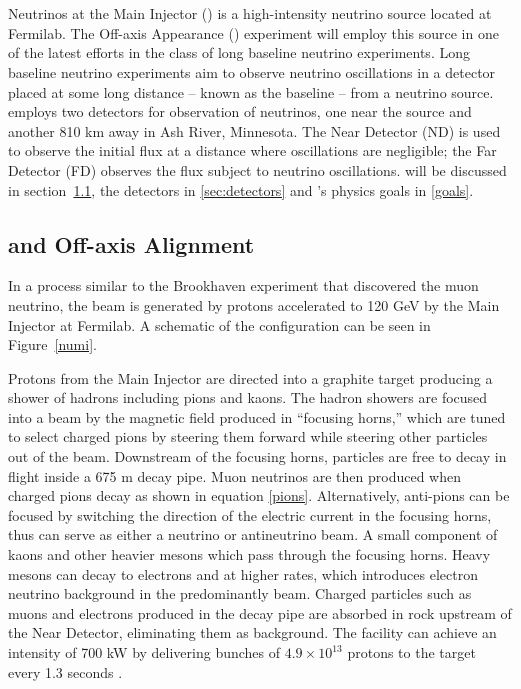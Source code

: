 \chapter{\nova}
\label{nova_chapter}
Neutrinos at the Main Injector (\numi) is a high-intensity neutrino source located at Fermilab.  The \numi Off-axis \nue Appearance (\nova) experiment will employ this source in one of the latest efforts in the class of long baseline neutrino experiments.  Long baseline neutrino experiments aim to observe neutrino oscillations in a detector placed at some long distance -- known as the baseline -- from a neutrino source.  \nova employs two detectors for observation of neutrinos, one near the source and another 810 km away in Ash River, Minnesota.  The Near Detector (ND) is used to observe the initial  \numi flux at a distance where oscillations are negligible; the Far Detector (FD) observes the \numi flux subject to neutrino oscillations.  \numi will be discussed in section~\ref{sec:numi}, the detectors in \ref{sec:detectors} and \nova's physics goals in \ref{goals}. 

\section{\numi and  Off-axis Alignment }\label{sec:numi}

In a process similar to the Brookhaven experiment that discovered the muon neutrino, the \numi beam is generated by protons accelerated to 120 GeV by the Main Injector at Fermilab.  A schematic of the \numi configuration can be seen in Figure~\ref{numi}.  

Protons from the Main Injector are directed into a graphite target producing a shower of hadrons including pions and kaons.  The hadron showers are focused into a beam by the magnetic field produced in ``focusing horns,'' which are tuned to select charged pions by steering them forward while steering other particles out of the beam.  Downstream of the focusing horns, particles are free to decay in flight inside a 675 m decay pipe.  Muon neutrinos are then produced when charged pions decay as shown in equation \eqref{pions}.  Alternatively, anti-pions can be focused by switching the direction of the electric current in the focusing horns, thus \numi can serve as either a neutrino or antineutrino beam.  A small component of kaons and other heavier mesons which pass through the focusing horns.  Heavy mesons can decay to electrons and \nue at higher rates, which introduces electron neutrino background in the predominantly \numu beam.  Charged particles such as muons and electrons produced in the decay pipe are absorbed in rock upstream of the \nova Near Detector, eliminating them as background.  The \numi facility can achieve an intensity of 700 kW by delivering bunches of $4.9 \times 10^{13}$ protons to the target every 1.3 seconds \cite{tdr}.

